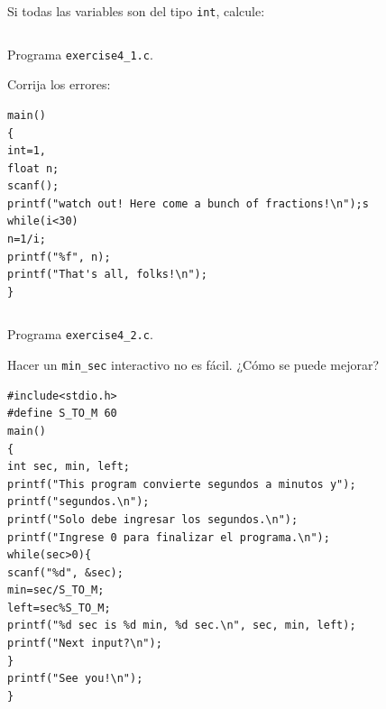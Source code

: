 \documentclass[spanish,addpoints,answers,a4paper]{exam}
\begin{document}
\begin{questions}

\question  Si todas las variables son del tipo \texttt{int}, calcule:


\begin{solution}

\begin{listing}[H]
	\footnotesize
	\inputminted{c}{exercise4_1.c}
	\caption{Programa \texttt{exercise4\_1.c}.}
	\label{lst:4.1}
\end{listing}
\end{solution}

\question Corrija los errores:

\begin{verbatim}
main()
{
int=1,
float n;
scanf();
printf("watch out! Here come a bunch of fractions!\n");s
while(i<30)
n=1/i;
printf("%f", n);
printf("That's all, folks!\n");
}
\end{verbatim}

\begin{solution}
	
	\begin{listing}[H]
		\footnotesize
		\inputminted{c}{exercise4_2.c}
		\caption{Programa \texttt{exercise4\_2.c}.}
		\label{lst:4.2}
	\end{listing}
\end{solution}

\question Hacer un \texttt{min_sec} interactivo no es fácil. ¿Cómo se puede mejorar?

\begin{verbatim}
#include<stdio.h>
#define S_TO_M 60
main()
{
int sec, min, left;
printf("This program convierte segundos a minutos y");
printf("segundos.\n");
printf("Solo debe ingresar los segundos.\n");
printf("Ingrese 0 para finalizar el programa.\n");
while(sec>0){
scanf("%d", &sec);
min=sec/S_TO_M;
left=sec%S_TO_M;
printf("%d sec is %d min, %d sec.\n", sec, min, left);
printf("Next input?\n");
}
printf("See you!\n");
}
\end{verbatim}


\end{questions}
\end{document}
